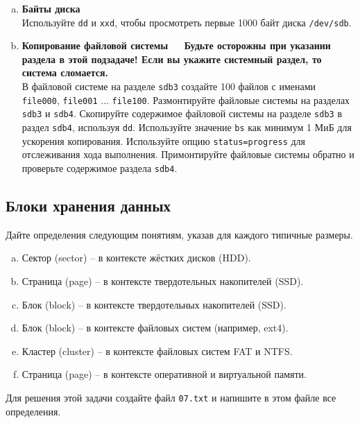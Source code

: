 \documentclass{article}
\begin{document}
\begin{enumerate}[(a)]
\item \textbf{Байты диска}\\
Используйте \texttt{dd} и \texttt{xxd}, чтобы просмотреть первые 1000 байт диска \texttt{/dev/sdb}.

\item \textbf{Копирование файловой системы} ~~ \textbf{Будьте осторожны при указании раздела в этой подзадаче! Если вы укажите системный раздел, то система сломается.}\\
В файловой системе на разделе \texttt{sdb3} создайте 100 файлов с именами \texttt{file000}, \texttt{file001} ... \texttt{file100}. Размонтируйте файловые системы на разделах \texttt{sdb3} и \texttt{sdb4}. Скопируйте содержимое файловой системы на разделе \texttt{sdb3} в раздел \texttt{sdb4}, используя \texttt{dd}. Используйте значение \texttt{bs} как минимум 1 МиБ для ускорения копирования. Используйте опцию \texttt{status=progress} для отслеживания хода выполнения. Примонтируйте файловые системы обратно и проверьте содержимое раздела \texttt{sdb4}.
\end{enumerate}

\subsection{Блоки хранения данных}
Дайте определения следующим понятиям, указав для каждого типичные размеры.
\begin{enumerate}[(a)]
\item Сектор (sector) -- в контексте жёстких дисков (HDD).
\item Страница (page) -- в контексте твердотельных накопителей (SSD).
\item Блок (block) -- в контексте твердотельных накопителей (SSD).
\item Блок (block) -- в контексте файловых систем (например, ext4).
\item Кластер (cluster) -- в контексте файловых систем FAT и NTFS.
\item Страница (page) -- в контексте оперативной и виртуальной памяти.
\end{enumerate}
Для решения этой задачи создайте файл \texttt{07.txt} и напишите в этом файле все определения.
\end{document}
